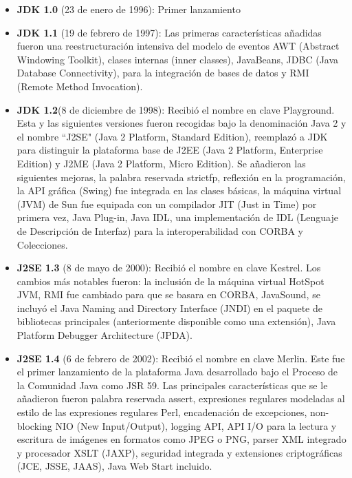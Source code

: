 \begin{itemize}

	\item \textbf{JDK 1.0} (23 de enero de 1996): Primer lanzamiento
	
	\item \textbf{JDK 1.1} (19 de febrero de 1997): Las primeras características añadidas fueron una reestructuración intensiva del modelo de eventos AWT (Abstract Windowing Toolkit), clases internas (inner classes), JavaBeans, JDBC (Java Database Connectivity), para la integración de bases de datos y RMI (Remote Method Invocation).
	
     \item \textbf{JDK 1.2}(8 de diciembre de 1998): Recibió el nombre en clave Playground. Esta y las siguientes versiones fueron recogidas bajo la denominación Java 2 y el nombre ``J2SE" (Java 2 Platform, Standard Edition), reemplazó a JDK para distinguir la plataforma base de J2EE (Java 2 Platform, Enterprise Edition) y J2ME (Java 2 Platform, Micro Edition). 
    Se añadieron las siguientes mejoras, la palabra reservada strictfp, reflexión en la programación, la API gráfica (Swing) fue integrada en las clases básicas, la máquina virtual (JVM) de Sun fue equipada con un compilador JIT (Just in Time) por primera vez, Java Plug-in, Java IDL, una implementación de IDL (Lenguaje de Descripción de Interfaz) para la interoperabilidad con CORBA y Colecciones.

    \item \textbf{J2SE 1.3} (8 de mayo de 2000): Recibió el nombre en clave Kestrel. Los cambios más notables fueron: la inclusión de la máquina virtual HotSpot JVM, RMI fue cambiado para que se basara en CORBA, JavaSound, se incluyó el Java Naming and Directory Interface (JNDI) en el paquete de bibliotecas principales (anteriormente disponible como una extensión), Java Platform Debugger Architecture (JPDA).

    \item \textbf{J2SE 1.4} (6 de febrero de 2002): Recibió el nombre en clave Merlin. Este fue el primer lanzamiento de la plataforma Java desarrollado bajo el Proceso de la Comunidad Java como JSR 59. Las principales características que se le añadieron fueron palabra reservada assert, expresiones regulares modeladas al estilo de las expresiones regulares Perl, encadenación de excepciones, non-blocking NIO (New Input/Output), logging API, API I/O para la lectura y escritura de imágenes en formatos como JPEG o PNG, parser XML integrado y procesador XSLT (JAXP), seguridad integrada y extensiones criptográficas (JCE, JSSE, JAAS), Java Web Start incluido.
    

\end{itemize}
